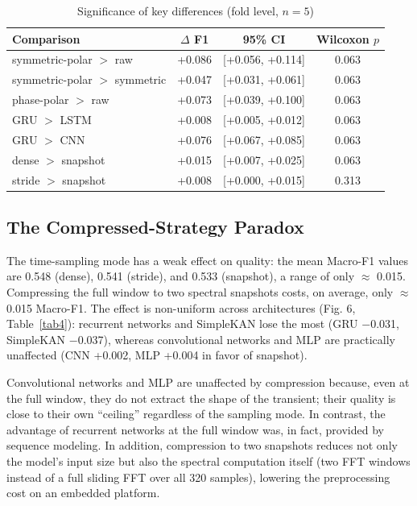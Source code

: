 \documentclass{ieeeojies}
\begin{document}
\begin{table}[!t]
\caption{Significance of key differences (fold level, $n=5$)}\label{tab3}
\centering\setlength{\tabcolsep}{3pt}
\begin{tabular}{lccc}
\hline
Comparison & $\Delta$ F1 & 95\% CI & Wilcoxon $p$\\ \hline
symmetric-polar $>$ raw & +0.086 & [+0.056, +0.114] & 0.063\\
symmetric-polar $>$ symmetric & +0.047 & [+0.031, +0.061] & 0.063\\
phase-polar $>$ raw & +0.073 & [+0.039, +0.100] & 0.063\\
GRU $>$ LSTM & +0.008 & [+0.005, +0.012] & 0.063\\
GRU $>$ CNN & +0.076 & [+0.067, +0.085] & 0.063\\
dense $>$ snapshot & +0.015 & [+0.007, +0.025] & 0.063\\
stride $>$ snapshot & +0.008 & [+0.000, +0.015] & 0.313\\ \hline
\end{tabular}
\par\vspace{2pt}{\footnotesize $\Delta$ F1 is the difference in Macro-F1; confidence intervals are bootstrap estimates (10,000 resamples). All differences except stride $>$ snapshot are sign-consistent across all 5 folds (p = 0.0625, the exact minimum for n = 5) and have a CI that excludes zero.}
\end{table}

\subsection{The Compressed-Strategy Paradox}

The time-sampling mode has a weak effect on quality: the mean Macro-F1 values are 0.548 (dense), 0.541 (stride), and 0.533 (snapshot), a range of only $\approx$ 0.015. Compressing the full window to two spectral snapshots costs, on average, only $\approx$ 0.015 Macro-F1. The effect is non-uniform across architectures (Fig. 6, Table~\ref{tab4}): recurrent networks and SimpleKAN lose the most (GRU $-$0.031, SimpleKAN $-$0.037), whereas convolutional networks and MLP are practically unaffected (CNN +0.002, MLP +0.004 in favor of snapshot).

Convolutional networks and MLP are unaffected by compression because, even at the full window, they do not extract the shape of the transient; their quality is close to their own ``ceiling'' regardless of the sampling mode. In contrast, the advantage of recurrent networks at the full window was, in fact, provided by sequence modeling. In addition, compression to two snapshots reduces not only the model's input size but also the spectral computation itself (two FFT windows instead of a full sliding FFT over all 320 samples), lowering the preprocessing cost on an embedded platform.
\end{document}
